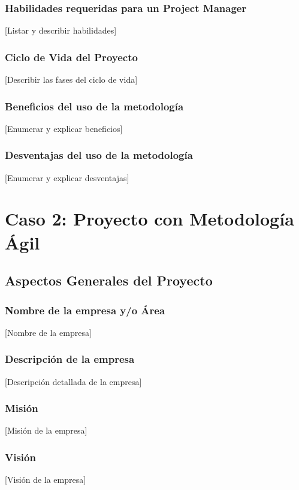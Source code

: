 \documentclass[12pt,a4paper]{article}
\begin{document}
\subsubsection{Habilidades requeridas para un Project Manager}
[Listar y describir habilidades]

\subsubsection{Ciclo de Vida del Proyecto}
[Describir las fases del ciclo de vida]

\subsubsection{Beneficios del uso de la metodología}
[Enumerar y explicar beneficios]

\subsubsection{Desventajas del uso de la metodología}
[Enumerar y explicar desventajas]

\section{Caso 2: Proyecto con Metodología Ágil}
\subsection{Aspectos Generales del Proyecto}
\subsubsection{Nombre de la empresa y/o Área}
[Nombre de la empresa]

\subsubsection{Descripción de la empresa}
[Descripción detallada de la empresa]

\subsubsection{Misión}
[Misión de la empresa]

\subsubsection{Visión}
[Visión de la empresa]
\end{document}
